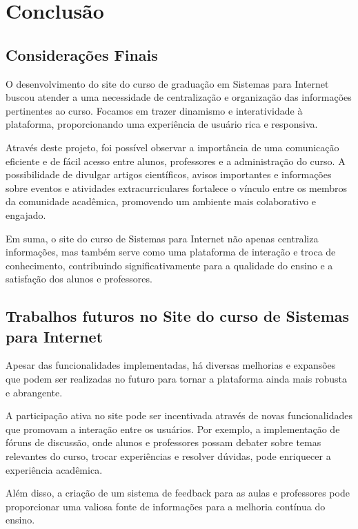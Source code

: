 \documentclass[a4paper,12pt]{report}
\begin{document}
\chapter{Conclusão} 

\section{Considerações Finais} 

O desenvolvimento do site do curso de graduação em Sistemas para Internet buscou atender a uma necessidade de centralização e organização das informações pertinentes ao curso. Focamos em trazer dinamismo e interatividade à plataforma, proporcionando uma experiência de usuário rica e responsiva. 

Através deste projeto, foi possível observar a importância de uma comunicação eficiente e de fácil acesso entre alunos, professores e a administração do curso. A possibilidade de divulgar artigos científicos, avisos importantes e informações sobre eventos e atividades extracurriculares fortalece o vínculo entre os membros da comunidade acadêmica, promovendo um ambiente mais colaborativo e engajado. 

Em suma, o site do curso de Sistemas para Internet não apenas centraliza informações, mas também serve como uma plataforma de interação e troca de conhecimento, contribuindo significativamente para a qualidade do ensino e a satisfação dos alunos e professores.

\section{Trabalhos futuros no Site do curso de Sistemas para Internet} 

Apesar das funcionalidades implementadas, há diversas melhorias e expansões que podem ser realizadas no futuro para tornar a plataforma ainda mais robusta e abrangente. 

A participação ativa no site pode ser incentivada através de novas funcionalidades que promovam a interação entre os usuários. Por exemplo, a implementação de fóruns de discussão, onde alunos e professores possam debater sobre temas relevantes do curso, trocar experiências e resolver dúvidas, pode enriquecer a experiência acadêmica.  

Além disso, a criação de um sistema de feedback para as aulas e professores pode proporcionar uma valiosa fonte de informações para a melhoria contínua do ensino. 
\end{document}

